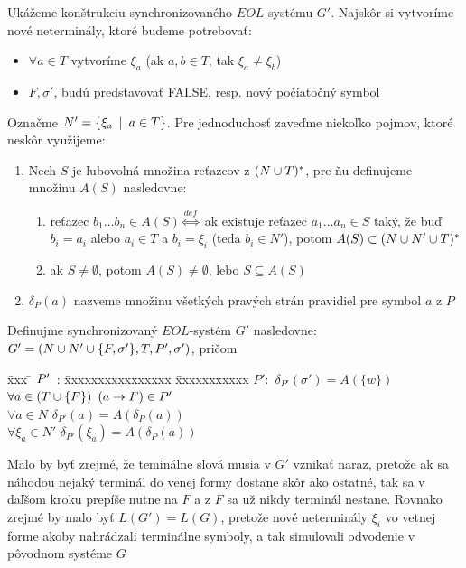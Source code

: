 \begin{dokaz}
  Ukážeme konštrukciu synchronizovaného $EOL$-systému $G'$. Najskôr
  si vytvoríme nové neterminály, ktoré budeme potrebovať:
  \begin{itemize}
    \item $\forall a\in T$ vytvoríme $\xi_a$ (ak $a,b\in T$, tak
    $\xi_a\neq\xi_b$)
    \item $F,\sigma'$, budú predstavovať FALSE, resp. nový počiatočný
    symbol
  \end{itemize}
  Označme $N'=\{\xi_a\enspace |\enspace a\in T\}$. Pre jednoduchosť zaveďme
  niekoľko pojmov, ktoré neskôr využijeme:
  \begin{enumerate}
    \item Nech $S$ je ľubovoľná množina reťazcov z $(N\cup T)^*$, pre
      ňu definujeme množinu $A(S)$ nasledovne:
      \begin{enumerate}
        \item reťazec $b_{1}\dots b_{n}\in A(S)\overset{def}
          \Longleftrightarrow$ ak existuje reťazec $a_{1}\dots a_{n}\in S$
          taký, že buď $b_i=a_i$ alebo $a_i\in T$ a $b_i=\xi_i$ (teda
          $b_i\in N'$), potom $A(S)\subset(N\cup N'\cup T)^*$
        \item ak $S\neq\emptyset$, potom $A(S)\neq\emptyset$, lebo
          $S\subseteq A(S)$
      \end{enumerate}
    \item $\delta_P(a)$ nazveme množinu všetkých pravých strán
    pravidiel pre symbol $a$ z $P$
  \end{enumerate}
  Definujme synchronizovaný $EOL$-systém $G'$ nasledovne: $G'=(N\cup
  N'\cup\{F,\sigma'\},T,P',\sigma')$, pričom
  \begin{tabbing}
    \= xxx \= $P'\enspace$: \= xxxxxxxxxxxxxxxx \= xxxxxxxxxxx \kill \>\>
    $P':$ \> $\delta_{P'}(\sigma')=A(\{w\})$\\ \>\>\> $\forall
    a\in(T\cup \{F\})$ \> $(a\rightarrow F)\in P'$\\ \>\>\> $\forall a\in N$
    \> $\delta_{P'}(a)=A(\delta_P(a))$\\ \>\>\> $\forall\xi_a\in N'$
    \> $\delta_{P'}(\xi_a)=A(\delta_P(a))$
  \end{tabbing}
  Malo by byť zrejmé, že teminálne slová musia v $G'$ vznikať naraz,
  pretože ak sa náhodou nejaký terminál do venej formy dostane skôr
  ako ostatné, tak sa v ďaľšom kroku prepíše nutne na $F$ a z $F$ sa
  už nikdy terminál nestane. Rovnako zrejmé by malo byť
  $L(G')=L(G)$, pretože nové neterminály $\xi_i$ vo vetnej forme
  akoby nahrádzali terminálne symboly, a tak simulovali odvodenie v
  pôvodnom systéme $G$
\end{dokaz}

